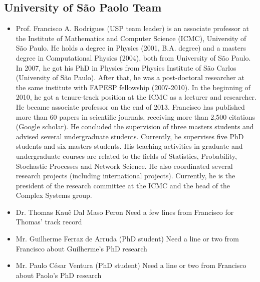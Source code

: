 \subsection{University of S\~{a}o Paolo Team}
\begin{itemize}
\item {\hvnb Prof. Francisco A. Rodrigues (USP team leader)} is an associate 
professor at the Institute of Mathematics and Computer Science (ICMC), 
University of S\~{a}o Paulo. He holds a degree in Physics (2001, B.A. degree) 
and a masters degree in Computational Physics (2004), both from University of 
S\~{a}o Paulo. In 2007, he got his PhD in Physics from Physics Institute of 
S\~{a}o Carlos (University of S\~{a}o Paulo). After that, he was a 
post-doctoral researcher at the same institute with FAPESP fellowship 
(2007-2010). In the beginning of 2010, he got a tenure-track position at the 
ICMC as a lecturer and researcher. He became associate professor on the end of 
2013. Francisco has published more than 60 papers in scientific journals, 
receiving more than 2,500 citations (Google scholar). He concluded the 
supervision of three masters students and advised several undergraduate 
students. Currently, he supervises five PhD students and six masters students. 
His teaching activities in graduate and undergraduate courses are related to 
the fields of Statistics, Probability, Stochastic Processes and Network 
Science. He also coordinated several research projects (including international 
projects).
Currently, he is the president of the research committee at the ICMC and the 
head of the Complex Systems group.

\item {\hvnb Dr. Thomas Kau\^{e} Dal Maso Peron}
{\color{red} Need a few lines from Francisco for Thomas' track record}
\item {\hvnb Mr. Guilherme Ferraz de Arruda (PhD student)}
{\color{red} Need a line or two from Francisco about Guilherme's PhD research}
\item {\hvnb Mr. Paulo C\'{e}sar Ventura (PhD student)}
{\color{red} Need a line or two from Francisco about Paolo's PhD research}
\end{itemize}


